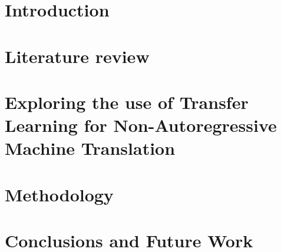 \documentclass[12pt,a4paper,twoside]{report}
\begin{document}


\doublespacing



\singlespacing          %
\listoffigures          %

\listoftables           %

\printbibliography[keyword=myref,title={My Publications}]




\tableofcontents

\doublespacing
\chapter{Introduction}     %

\chapter{Literature review} 


\chapter{Exploring the use of Transfer Learning for Non-Autoregressive Machine Translation}


\chapter{Methodology}


\chapter{Conclusions and Future Work}


    

\printbibliography
\end{document}
